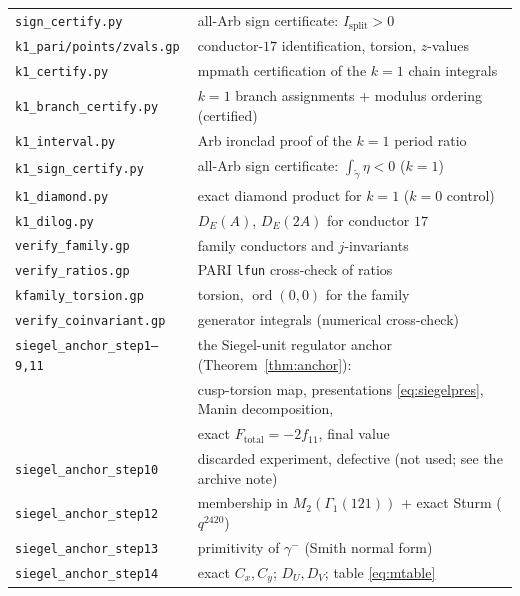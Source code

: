 \documentclass[preprint,12pt]{elsarticle}
\theoremstyle{definition}
\theoremstyle{remark}
\begin{document}
\begin{center}
\begin{tabular}{@{}ll@{}}
\texttt{sign\_certify.py} & all-Arb sign certificate: $I_{\mathrm{split}}>0$\\
\texttt{k1\_pari/points/zvals.gp} & conductor-$17$ identification, torsion, $z$-values\\
\texttt{k1\_certify.py} & mpmath certification of the $k=1$ chain integrals\\
\texttt{k1\_branch\_certify.py} & $k=1$ branch assignments + modulus ordering (certified)\\
\texttt{k1\_interval.py} & Arb ironclad proof of the $k=1$ period ratio\\
\texttt{k1\_sign\_certify.py} & all-Arb sign certificate: $\int_{\tilde\gamma}\eta<0$ ($k=1$)\\
\texttt{k1\_diamond.py} & exact diamond product for $k=1$ ($k=0$ control)\\
\texttt{k1\_dilog.py} & $D_E(A)$, $D_E(2A)$ for conductor $17$\\
\texttt{verify\_family.gp} & family conductors and $j$-invariants\\
\texttt{verify\_ratios.gp} & PARI \texttt{lfun} cross-check of ratios\\
\texttt{kfamily\_torsion.gp} & torsion, $\operatorname{ord}(0,0)$ for the family\\
\texttt{verify\_coinvariant.gp} & generator integrals (numerical cross-check)\\
\texttt{siegel\_anchor\_step1--9,11} & the Siegel-unit regulator anchor
  (Theorem~\ref{thm:anchor}):\\
  & cusp-torsion map, presentations \eqref{eq:siegelpres}, Manin
    decomposition,\\
  & exact $F_{\mathrm{total}}=-2f_{11}$, final value\\
\texttt{siegel\_anchor\_step10} & discarded experiment, defective
  (not used; see the archive note)\\
\texttt{siegel\_anchor\_step12} & membership in $M_2(\Gamma_1(121))$ +
  exact Sturm ($q^{2420}$)\\
\texttt{siegel\_anchor\_step13} & primitivity of $\gamma^-$ (Smith normal
  form)\\
\texttt{siegel\_anchor\_step14} & exact $C_x,C_y$; $D_U,D_V$; table
  \eqref{eq:mtable}\\
\bottomrule
\end{tabular}
\end{center}
\end{document}
